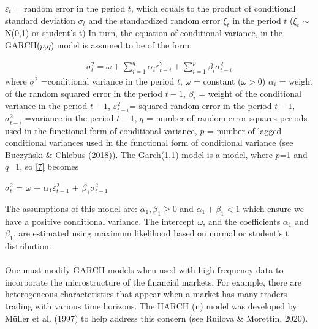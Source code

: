 \documentclass[a4paper,11pt,oneside]{book}
\begin{document}
$\varepsilon_t$ = random error in the period $t$, which equals to the
product of conditional standard deviation $\sigma_t$ and  the
standardized random error $\xi_t$ in the period $t$ ($\xi_t$ $\sim$ N(0,1) or student's t)
\newline\newline
In turn, the equation of conditional variance, in the GARCH($p$,$q$) model is assumed to be of the form:


\begin{equation}
\begin{aligned}
\sigma^2_t = \omega + \sum_{i=1}^{q}\alpha_{i}\varepsilon^{2}_{t-i} + \sum_{i=1}^{p}\beta_{i} \sigma^2_{t-i}
\label{7}
\end{aligned}
\end{equation}
where $\sigma^2$ =conditional variance in the period $t$,\newline
$\omega$ = constant ($\omega>0$)\newline
$\alpha_{i}$ = weight of the random squared error in the period $t-1$,\newline
$\beta_{i}$ = weight of the conditional variance in the period $t-1$,\newline
$\varepsilon^{2}_{t-i}$= squared random error in the period $t-1$,\newline
$\sigma^2_{t-i}$ =variance in the period $t-1$,\newline
$q$ = number of random error squares periods used in the functional form of conditional variance,\newline
$p$ = number of lagged conditional variances used in the
functional form of conditional variance (see Buczyński \& Chlebus (2018)).\newline\newline
The Garch(1,1) model is a model, where $p$=1 and $q$=1, so \autoref{7} becomes
\begin{center}
$\sigma^2_t$ = $\omega$ + $\alpha_{1}\varepsilon^{2}_{t-1}$ + $\beta_{1} \sigma^2_{t-1}$
\end{center}
The assumptions of this model are: $\alpha_{1},\beta_{1}\geq0$ and $\alpha_{1}+\beta_{1}<1$ which ensure we have a positive conditional variance. The intercept $\omega$, and the coefficients $\alpha_1$ and $\beta_1$, are estimated using maximum likelihood based on normal or student's t distribution.\\\\
One must modify GARCH models when used with high frequency data to incorporate the microstructure of the financial markets. For example, there are heterogeneous characteristics that appear when a market has many traders trading with various time horizons. The HARCH (n) model was developed by Müller et al. (1997) to help address this concern (see Ruilova \& Morettin, 2020).
\end{document}
